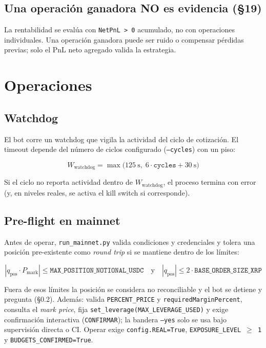 \documentclass[11pt,a4paper]{article}
\newcommand{\codigo}[1]{\texttt{#1}}
\begin{document}
\subsection{Una operación ganadora NO es evidencia (§19)}
La rentabilidad se evalúa con \codigo{NetPnL > 0} acumulado, no con
operaciones individuales. Una operación ganadora puede ser ruido o
compensar pérdidas previas; solo el PnL neto agregado valida la
estrategia.

\section{Operaciones}

\subsection{Watchdog}
El bot corre un watchdog que vigila la actividad del ciclo de
cotización. El timeout depende del número de ciclos configurado
(\codigo{--cycles}) con un piso:

\begin{equation}
  W_{\mathrm{watchdog}}
  = \max\!\bigl(125~\text{s},\; 6\cdot\codigo{cycles} + 30~\text{s}\bigr)
\end{equation}

Si el ciclo no reporta actividad dentro de $W_{\mathrm{watchdog}}$, el
proceso termina con error (y, en niveles reales, se activa el kill
switch si corresponde).

\subsection{Pre-flight en mainnet}
Antes de operar, \codigo{run\_mainnet.py} valida condiciones y
credenciales y tolera una posición pre-existente como \emph{round trip}
si se mantiene dentro de los límites:

\begin{equation}
  |q_{\mathrm{pos}}\cdot P_{\mathrm{mark}}|
  \leq \codigo{MAX\_POSITION\_NOTIONAL\_USDC}
  \quad\text{y}\quad
  |q_{\mathrm{pos}}|
  \leq 2\cdot\codigo{BASE\_ORDER\_SIZE\_XRP}
\end{equation}

Fuera de esos límites la posición se considera no reconciliable y el bot
se detiene y pregunta (§0.2). Además: valida
\codigo{PERCENT\_PRICE} y \codigo{requiredMarginPercent}, consulta el
\emph{mark price}, fija \codigo{set\_leverage(MAX\_LEVERAGE\_USED)} y
exige confirmación interactiva (\codigo{CONFIRMAR}); la bandera
\codigo{--yes} solo se usa bajo supervisión directa o CI. Operar exige
\codigo{config.REAL=True}, \codigo{EXPOSURE\_LEVEL $\geq$ 1} y
\codigo{BUDGETS\_CONFIRMED=True}.
\end{document}
